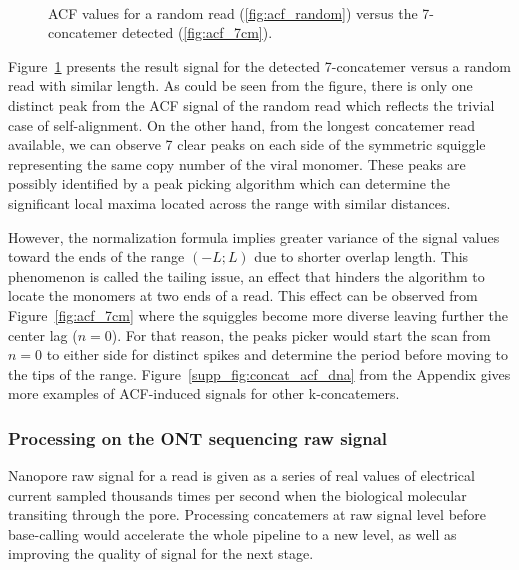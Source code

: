 \begin{figure}[!ht]
\centering
{}
~
\caption{ACF values for a random read (\ref{fig:acf_random}) versus the 7-concatemer detected (\ref{fig:acf_7cm}).}
\label{fig:concat_acf_dna}
\end{figure}
Figure~\ref{fig:concat_acf_dna} presents the result signal for the detected 7-concatemer versus a random read with similar length.
As could be seen from the figure, there is only one distinct peak from the ACF signal of the random read which reflects the trivial case of self-alignment. On the other hand, from the longest concatemer read available, we can observe 7 clear peaks on each side of the symmetric squiggle representing the same copy number of the viral monomer.
These peaks are possibly identified by a peak picking algorithm which can determine the significant local maxima located across the range with similar distances. 

However, the normalization formula implies greater variance of the signal values toward the ends of the range $(-L;L)$ due to shorter overlap length. This phenomenon is called the tailing issue, an effect that hinders the algorithm to locate the monomers at two ends of a read. This effect can be observed from Figure~\ref{fig:acf_7cm} where the squiggles become more diverse leaving further the center lag ($n=0$).
For that reason, the peaks picker would start the scan from $n=0$ to either side for distinct spikes and determine the period before moving to the tips of the range.
Figure~\ref{supp_fig:concat_acf_dna} from the Appendix gives more examples of ACF-induced signals for other k-concatemers.

\subsubsection{Processing on the ONT sequencing raw signal}
Nanopore raw signal for a read is given as a series of real values of electrical current sampled thousands times per second when the biological molecular transiting through the pore. 
Processing concatemers at raw signal level before base-calling would accelerate the whole pipeline to a new level, as well as improving the quality of signal for the next stage. 

